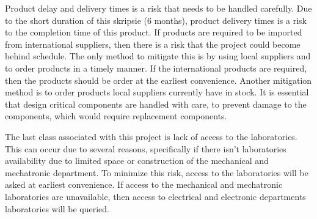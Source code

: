Product delay and delivery times is a risk that needs to be handled carefully. Due to the short duration of this skripsie (6 months), product delivery times is a risk to the completion time of this product. If products are required to be imported from international suppliers, then there is a risk that the project could become behind schedule. The only method to mitigate this is by using local suppliers and to order products in a timely manner. If the international products are required, then the products should be order at the earliest convenience.  Another mitigation method is to order products local suppliers currently have in stock. It is essential that design critical components are handled with care, to prevent damage to the components, which would require replacement components.


The last class associated with this project is lack of access to the laboratories. This can occur due to several reasons, specifically if there isn't laboratories availability due to limited space or construction of the mechanical and mechatronic department. To minimize this risk, access to the laboratories will be asked at earliest convenience. If access to the mechanical and mechatronic laboratories are unavailable, then access to electrical and electronic departments laboratories will be queried.


